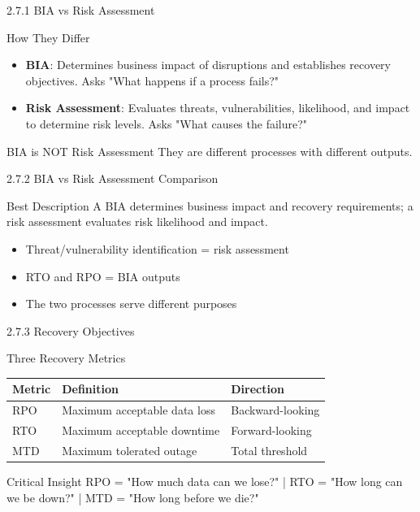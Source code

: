 \documentclass{beamer}
\begin{document}
	\begin{frame}{2.7.1 BIA vs Risk Assessment}
		\begin{block}{How They Differ}
			\begin{itemize}
				\item \textbf{BIA}: Determines business impact of disruptions and establishes recovery objectives. Asks "What happens if a process fails?"
				\item \textbf{Risk Assessment}: Evaluates threats, vulnerabilities, likelihood, and impact to determine risk levels. Asks "What causes the failure?"
			\end{itemize}
		\end{block}
		\begin{alertblock}{BIA is NOT Risk Assessment}
			They are different processes with different outputs.
		\end{alertblock}
	\end{frame}
	
	\begin{frame}{2.7.2 BIA vs Risk Assessment Comparison}
		\begin{block}{Best Description}
			A BIA determines business impact and recovery requirements; a risk assessment evaluates risk likelihood and impact.
		\end{block}
		\begin{itemize}
			\item Threat/vulnerability identification = risk assessment
			\item RTO and RPO = BIA outputs
			\item The two processes serve different purposes
		\end{itemize}
	\end{frame}
	
	\begin{frame}{2.7.3 Recovery Objectives}
		\begin{block}{Three Recovery Metrics}
			\begin{tabular}{|p{2.5cm}|p{4cm}|p{4.5cm}|}
				\hline
				\textbf{Metric} & \textbf{Definition} & \textbf{Direction} \\
				\hline
				RPO & Maximum acceptable data loss & Backward-looking \\
				\hline
				RTO & Maximum acceptable downtime & Forward-looking \\
				\hline
				MTD & Maximum tolerated outage & Total threshold \\
				\hline
			\end{tabular}
		\end{block}
		\begin{alertblock}{Critical Insight}
			RPO = "How much data can we lose?" | RTO = "How long can we be down?" | MTD = "How long before we die?"
		\end{alertblock}
	\end{frame}
	
\end{document}
